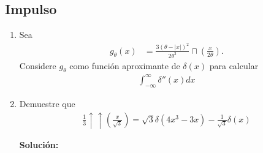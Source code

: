 \documentclass[letterpaper, 12pt]{article}
\newif\ifanswers
\begin{document}
\subsection*{Impulso}

\begin{enumerate}


    \item Sea
    \begin{align*}
        g_{\theta}(x) &= \frac{3(\theta-|x|)^2}{2\theta^3} \sqcap\left(\frac{x}{2\theta}\right).
    \end{align*}
    Considere $g_{\theta}$ como función aproximante de $\delta(x)$ para calcular
    \begin{align*}
        \int_{-\infty}^{\infty} \delta''(x)dx
    \end{align*}

    
    \ifanswers
    {\color{red}
    \textbf{Solución:}

    La integral pedida es igual a
    \begin{align*}
        \int_{-\infty}^{\infty} \delta''(x)dx &= \lim_{\theta \rightarrow 0} \int_{-\infty}^{\infty} \frac{d}{dx}\left\{ -\frac{3}{\theta^3}(\theta-|x|)sgn(x)\sqcap(x/2\theta)\right\} dx
    \end{align*}
    Es importante notar que la derivada de $g_{\theta}(x)$ en $x=\pm \theta$ es 0, por lo que no hay impulsos en esas posiciones. Así,
    \begin{align*}
        \int_{-\infty}^{\infty} \delta''(x)dx &= \lim_{\theta \rightarrow 0} \int_{-\infty}^{\infty} \left\{ \frac{3}{\theta^3}\sqcap(x/2\theta)-\frac{6}{\theta^2}\delta(x) \right\}dx \\
        &= \lim_{\theta \rightarrow 0} \left\{\frac{6}{\theta^2}-\frac{6}{\theta^2}\right\} = 0
    \end{align*}
    
    
    }

    \fi



    \item Demuestre que
    \begin{align*}
        \frac{1}{3}\uparrow\uparrow\left(\frac{x}{\sqrt{3}}\right)=\sqrt{3}\delta(4x^3-3x)-\frac{1}{\sqrt{3}}\delta(x)
    \end{align*}

    \ifanswers
  {\color{red}  \textbf{Solución:}

}
\end{enumerate}
\end{document}
